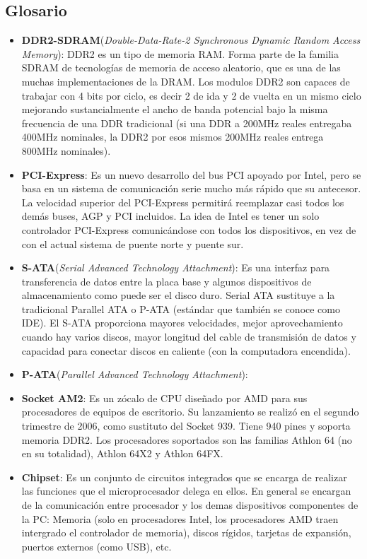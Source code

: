 \subsection{Glosario}

\begin{itemize}
\item \textbf{DDR2-SDRAM}(\textit{Double-Data-Rate-2 Synchronous Dynamic Random Access
Memory}): DDR2 es un tipo de memoria RAM. Forma parte de la familia SDRAM de
tecnologías de memoria de acceso aleatorio, que es una de las muchas
implementaciones de la DRAM. Los modulos DDR2 son capaces de trabajar con 4 bits
por ciclo, es decir 2 de ida y 2 de vuelta en un mismo ciclo mejorando
sustancialmente el ancho de banda potencial bajo la misma frecuencia de una DDR
tradicional (si una DDR a 200MHz reales entregaba 400MHz nominales, la DDR2 por
esos mismos 200MHz reales entrega 800MHz nominales).

\item \textbf{PCI-Express}: Es un nuevo desarrollo del bus PCI apoyado por
Intel, pero se basa en un sistema de comunicación serie mucho más rápido que su
antecesor. La velocidad superior del PCI-Express permitirá reemplazar casi todos
los demás buses, AGP y PCI incluidos. La idea de Intel es tener un solo
controlador PCI-Express comunicándose con todos los dispositivos, en vez de con
el actual sistema de puente norte y puente sur.

\item \textbf{S-ATA}(\textit{Serial Advanced Technology Attachment}): Es una interfaz
para transferencia de datos entre la placa base y algunos dispositivos de
almacenamiento como puede ser el disco duro. Serial ATA sustituye a la
tradicional Parallel ATA o P-ATA (estándar que también se conoce como IDE). El
S-ATA proporciona mayores velocidades, mejor aprovechamiento cuando hay varios
discos, mayor longitud del cable de transmisión de datos y capacidad para
conectar discos en caliente (con la computadora encendida).

\item \textbf{P-ATA}(\textit{Parallel Advanced Technology Attachment}):

\item \textbf{Socket AM2}: Es un zócalo de CPU diseñado por AMD para sus
procesadores de equipos de escritorio. Su lanzamiento se realizó en el segundo
trimestre de 2006, como sustituto del Socket 939. Tiene 940 pines y soporta
memoria DDR2. Los procesadores soportados son las familias Athlon 64 (no en su totalidad), Athlon 64X2
y Athlon 64FX.

\item \textbf{Chipset}: Es un conjunto de circuitos integrados que se encarga de realizar las funciones que el microprocesador delega en ellos. En general se encargan de la comunicación entre procesador y los demas dispositivos componentes de la PC: Memoria (solo en procesadores Intel, los procesadores AMD traen intergrado el controlador de memoria), discos rígidos, tarjetas de expansión, puertos externos (como USB), etc.
\end{itemize}